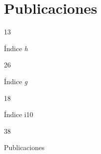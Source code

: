 \documentclass[11pt,a4paper,]{awesome-cv}
\begin{document}
\hypertarget{publicaciones}{%
\section{Publicaciones}\label{publicaciones}}

\begin{tcolorbox}[enhanced,
        on line, 
        boxsep=4pt, left=0pt,right=0pt,top=0pt,bottom=0pt,
        colframe=white,colback=teal,
        hyperurl={https://scholar.google.com/citations?user=8Q0jKHsAAAAJ}]
  
\color{white}
  \begin{minipage}[c]{0.245\linewidth}
    \begin{center} 
      \begin{huge} 13 \end{huge}
     \begin{small} Índice \textit{h} \end{small} 
    \end{center} 
  \end{minipage} 
  \begin{minipage}[c]{0.245\linewidth}
    \begin{center} 
      \begin{huge} 26 \end{huge}
      \begin{small} Índice \textit{g} \end{small} 
    \end{center}
  \end{minipage} 
  \begin{minipage}[c]{0.245\linewidth}
    \begin{center} 
      \begin{huge} 18 \end{huge}
      \begin{small} Índice i10 \end{small} 
    \end{center}
  \end{minipage} 
  \begin{minipage}[c]{0.245\linewidth}
    \begin{center}  
      \begin{huge} 38 \end{huge}
      \begin{small} Publicaciones \end{small} 
    \end{center}
  \end{minipage} 
  

\end{tcolorbox}
\end{document}
